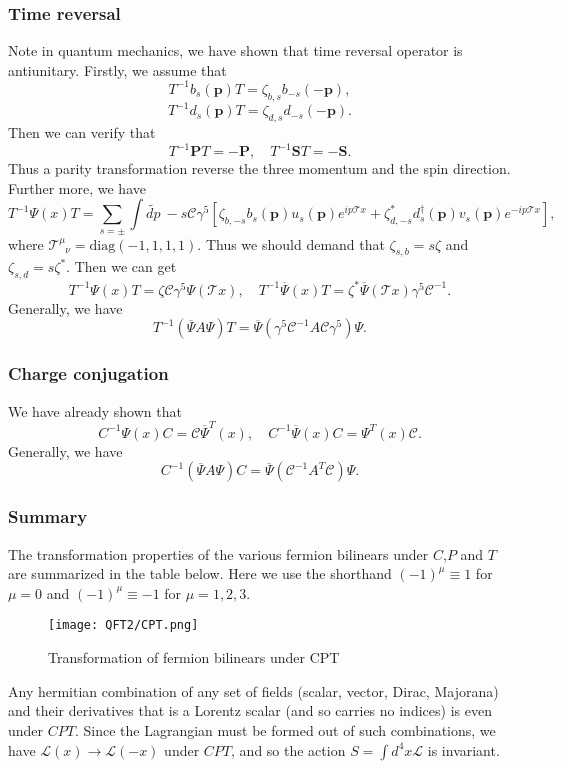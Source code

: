 \subsubsection{Time reversal}
Note in quantum mechanics, we have shown that time reversal operator is antiunitary. Firstly, we assume that
\[T^{-1} b_s(\bm{p}) T = \zeta_{b,s} b_{-s}(-\bm{p}),\]
\[T^{-1} d_s(\bm{p}) T = \zeta_{d,s} d_{-s}(-\bm{p}).\]
Then we can verify that
\[T^{-1} \bm{P} T = -\bm{P} , \quad T^{-1} \bm{S} T = - \bm{S}.\]
Thus a parity transformation reverse the three momentum and the spin direction. Further more, we have
\[T^{-1}\Psi(x)T = \sum_{s=\pm} \int \widetilde{dp} \: -s \mathcal{C} \gamma^5 \left [ \zeta_{b,-s} b_s(\bm{p}) u_s(\bm{p})e^{ip\mathcal{T}x} + \zeta_{d,-s}^* d^{\dagger}_s(\bm{p}) v_s(\bm{p})e^{-ip\mathcal{T}x} \right ],\]
where $\mathcal{T}^{\mu}_{\phantom{\mu}\nu} = \mathrm{diag}(-1,1,1,1)$. 
Thus we should demand that $\zeta_{s,b} = s \zeta$ and $\zeta_{s,d} = s \zeta^*$. 
Then we can get
\[T^{-1}\Psi(x)T = \zeta \mathcal{C} \gamma^5 \Psi(\mathcal{T}x) , \quad T^{-1}\overline{\Psi}(x)T = \zeta^*  \overline{\Psi}(\mathcal{T}x)\gamma^5 \mathcal{C}^{-1} .\]
Generally, we have
\[T^{-1} (\overline{\Psi} A \Psi) T = \overline{\Psi}(\gamma^5 \mathcal{C}^{-1} A \mathcal{C} \gamma^5)\Psi.\]

\subsubsection{Charge conjugation}
We have already shown that
\[C^{-1}\Psi(x)C = \mathcal{C} \overline{\Psi}^T(x) , \quad C^{-1}\overline{\Psi}(x)C = \Psi^T(x)\mathcal{C}.\]
Generally, we have
\[C^{-1}(\overline{\Psi} A \Psi )C = \overline{\Psi} (\mathcal{C}^{-1} A^T \mathcal{C})\Psi.\]

\subsubsection{Summary}
The transformation properties of the various fermion bilinears under $C$,$P$ and $T$ are summarized in the table below. Here we use the shorthand $(-1)^{\mu} \equiv 1$ for $\mu =0$ and $(-1)^{\mu} \equiv  -1$ for $\mu=1,2,3$.

\begin{figure}[!h]
\centering
\texttt{[image: QFT2/CPT.png]}
\caption{Transformation of fermion bilinears under CPT}
\end{figure}

\begin{newthem}
Any hermitian combination of any set of fields (scalar, vector, Dirac, Majorana) and their derivatives that is a Lorentz scalar (and so carries no indices) is even under $CPT$. Since the Lagrangian must be formed out of such combinations, we
have $\mathcal{L}(x) \to \mathcal{L}(-x)$ under $CPT$, and so the action $S = \int d^4x \mathcal{L}$ is invariant.
\end{newthem}

